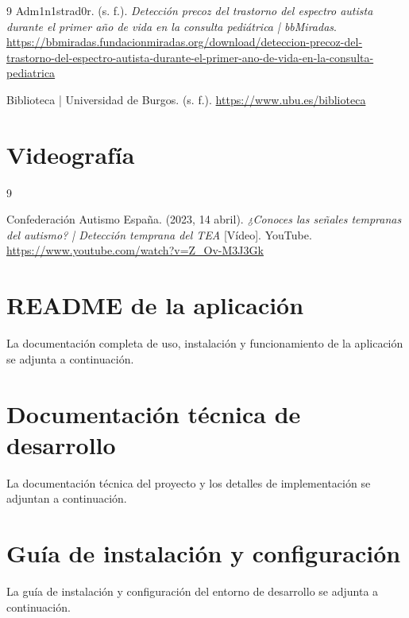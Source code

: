 \documentclass{article}
\begin{document}
\begin{thebibliography}{9}
Adm1n1strad0r. (s. f.). \textit{Detección precoz del trastorno del espectro autista durante el primer año de vida en la consulta pediátrica | bbMiradas}. \url{https://bbmiradas.fundacionmiradas.org/download/deteccion-precoz-del-trastorno-del-espectro-autista-durante-el-primer-ano-de-vida-en-la-consulta-pediatrica}

Biblioteca | Universidad de Burgos. (s. f.). \url{https://www.ubu.es/biblioteca}

\end{thebibliography}


\section{\textbf{Videografía}}
\begin{thebibliography}{9}

Confederación Autismo España. (2023, 14 abril). \textit{¿Conoces las señales tempranas del autismo? | Detección temprana del TEA} [Vídeo]. YouTube. \url{https://www.youtube.com/watch?v=Z_Ov-M3J3Gk}

\end{thebibliography}


\appendix

\section{README de la aplicación}
\label{anexo:readme}

La documentación completa de uso, instalación y funcionamiento de la aplicación se adjunta a continuación.



\newpage

\section{Documentación técnica de desarrollo}
\label{anexo:desarrollo}

La documentación técnica del proyecto y los detalles de implementación se adjuntan a continuación.



\newpage

\section{Guía de instalación y configuración}
\label{anexo:setup}

La guía de instalación y configuración del entorno de desarrollo se adjunta a continuación.


\end{document}
